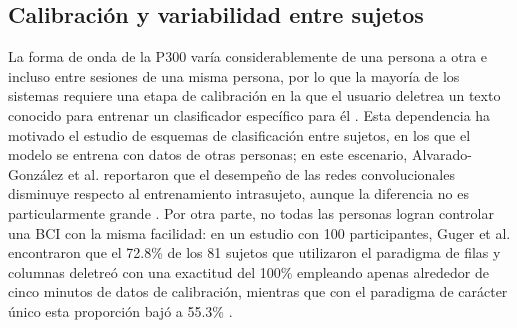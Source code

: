 \subsection{Calibración y variabilidad entre sujetos}

La forma de onda de la P300 varía considerablemente de una persona a otra e incluso entre sesiones
de una misma persona, por lo que la mayoría de los sistemas requiere una etapa de calibración en la
que el usuario deletrea un texto conocido para entrenar un clasificador específico para él
\cite{wolpaw2012}. Esta dependencia ha motivado el estudio de esquemas de clasificación entre
sujetos, en los que el modelo se entrena con datos de otras personas; en este escenario,
Alvarado-González et al. reportaron que el desempeño de las redes convolucionales disminuye
respecto al entrenamiento intrasujeto, aunque la diferencia no es particularmente grande
\cite{alvarado2021}. Por otra parte, no todas las personas logran controlar una BCI con la misma
facilidad: en un estudio con 100 participantes, Guger et al. encontraron que el 72.8\% de los 81
sujetos que utilizaron el paradigma de filas y columnas deletreó con una exactitud del 100\%
empleando apenas alrededor de cinco minutos de datos de calibración, mientras que con el
paradigma de carácter único esta proporción bajó a 55.3\% \cite{guger2009}.

